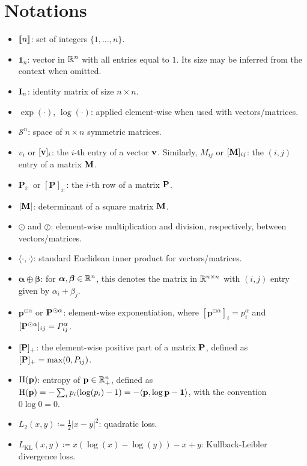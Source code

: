 \section*{Notations}

\begin{itemize}
    \item ${[\![n]\!]}$: set of integers $\{1,\dots,n\}$.
    \item $\mathbf{1}_n$: vector in $\mathbb{R}^n$ with all entries equal to $1$. Its size may be inferred from the context when omitted.
    \item ${\mathbf{I}}_n$: identity matrix of size $n \times n$.
    \item $\exp(\cdot)$, $\log(\cdot)$: applied element-wise when used with vectors/matrices.
    \item $\mathcal{S}^n$: space of $n \times n$ symmetric matrices.
    \item $v_i$ or $[{\mathbf{v}}]_i$: the $i$-th entry of a vector ${\mathbf{v}}$. Similarly, $M_{ij}$ or $[{\mathbf{M}}]_{ij}$: the $(i,j)$ entry of a matrix ${\mathbf{M}}$.
    \item $\mathbf{P}_{i:}$ or $[\mathbf{P}]_{i:}$: the $i$-th row of a matrix $\mathbf{P}$.
    \item $|{\mathbf{M}}|$: determinant of a square matrix ${\mathbf{M}}$.
    \item $\odot$ and $\oslash$: element-wise multiplication and division, respectively, between vectors/matrices.
    \item $\langle \cdot, \cdot \rangle$: standard Euclidean inner product for vectors/matrices.
    \item $\bm{\alpha} \oplus \bm{\beta}$: for $\bm{\alpha}, \bm{\beta} \in \mathbb{R}^n$, this denotes the matrix in $\mathbb{R}^{n \times n}$ with $(i,j)$ entry given by $\alpha_i + \beta_j$.
    \item $\bm{p}^{\odot \alpha}$ or ${\mathbf{P}}^{\odot \alpha}$: element-wise exponentiation, where $[\bm{p}^{\odot \alpha}]_i = p_i^\alpha$ and $[{\mathbf{P}}^{\odot \alpha}]_{ij} = P_{ij}^\alpha$.
    \item $[{\mathbf{P}}]_+$: the element-wise positive part of a matrix ${\mathbf{P}}$, defined as $[{\mathbf{P}}]_+ = \max(0, P_{ij})$.
    \item $\operatorname{H}(\mathbf{p})$: entropy of $\mathbf{p} \in \mathbb{R}^{n}_+$, defined as $\operatorname{H}(\mathbf{p}) = -\sum_{i} p_i (\log(p_i) - 1) = -\langle \mathbf{p}, \log \mathbf{p} - \bm{1} \rangle$, with the convention $0 \log 0 = 0$.
    \item $L_2(x,y) \coloneqq \frac{1}{2} |x - y|^2$: quadratic loss.
    \item $L_{\mathrm{KL}}(x,y) \coloneqq x (\log(x) - \log(y)) - x + y$: Kullback-Leibler divergence loss.

\end{itemize}
